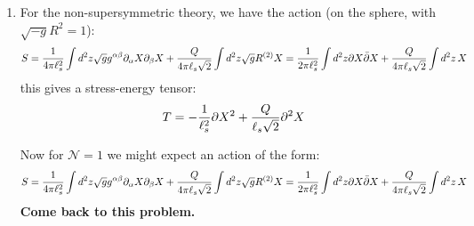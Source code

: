 \documentclass[11pt]{article}
\begin{document}
\begin{enumerate}
	\item For the non-supersymmetric theory, we have the action (on the sphere, with $\sqrt{-g} R^{2} = 1$):
	\[
		S = \frac{1}{4\pi \ell_s^2} \int d^2 z \sqrt{g} g^{\alpha \beta} \partial_\alpha X \partial_\beta X + \frac{Q}{4 \pi \ell_s \sqrt 2} \int d^2 z \sqrt{g} R^{(2)} X = \frac{1}{2\pi \ell_s^2} \int d^2 z \partial X \bar {\partial} X + \frac{Q}{4 \pi \ell_s \sqrt 2} \int d^2 z \, X
	\]
	this gives a stress-energy tensor:
	\[
		T = - \frac{1}{\ell_s^2} \partial X^2 + \frac{Q}{\ell_s \sqrt 2} \partial^2 X
	\]
	
	Now for $\mathcal N = 1$ we might expect an action of the form:
	\[
		S = \frac{1}{4\pi \ell_s^2} \int d^2 z \sqrt{g} g^{\alpha \beta} \partial_\alpha X \partial_\beta X + \frac{Q}{4 \pi \ell_s \sqrt 2} \int d^2 z \sqrt{g} R^{(2)} X = \frac{1}{2\pi \ell_s^2} \int d^2 z \partial X \bar {\partial} X + \frac{Q}{4 \pi \ell_s \sqrt 2} \int d^2 z \, X
	\]
	\textbf{Come back to this problem.}


\end{enumerate}
\end{document}
